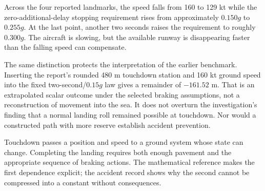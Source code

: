 Across the four reported landmarks, the speed falls from 160 to 129 kt while the zero-additional-delay stopping requirement rises from approximately $0.150g$ to $0.255g$. At the last point, another two seconds raises the requirement to roughly $0.300g$. The aircraft is slowing, but the available runway is disappearing faster than the falling speed can compensate.

The same distinction protects the interpretation of the earlier benchmark. Inserting the report's rounded 480 m touchdown station and 160 kt ground speed into the fixed two-second/$0.15g$ law gives a remainder of $-161.52$ m. That is an extrapolated scalar outcome under the selected braking assumptions, not a reconstruction of movement into the sea. It does not overturn the investigation's finding that a normal landing roll remained possible at touchdown. Nor would a constructed path with more reserve establish accident prevention.

Touchdown passes a position and speed to a ground system whose state can change. Completing the landing requires both enough pavement and the appropriate sequence of braking actions. The mathematical reference makes the first dependence explicit; the accident record shows why the second cannot be compressed into a constant without consequences.

